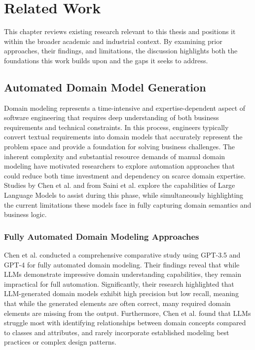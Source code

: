 \chapter{Related Work}\label{chapter:relatedwork}
This chapter reviews existing research relevant to this thesis and positions it within the broader academic and industrial context. By examining prior approaches, their findings, and limitations, the discussion highlights both the foundations this work builds upon and the gaps it seeks to address.

\section{Automated Domain Model Generation}\label{admg}
Domain modeling represents a time-intensive and expertise-dependent aspect of software engineering that requires deep understanding of both business requirements and technical constraints. In this process, engineers typically convert textual requirements into domain models that accurately represent the problem space and provide a foundation for solving business challenges. The inherent complexity and substantial resource demands of manual domain modeling have motivated researchers to explore automation approaches that could reduce both time investment and dependency on scarce domain expertise. Studies by Chen et al. \autocite{chen2023automated} and from Saini et al. \autocite{Saini2022} explore the capabilities of Large Language Models to assist during this phase, while simultaneously highlighting the current limitations these models face in fully capturing domain semantics and business logic. 

\subsection{Fully Automated Domain Modeling Approaches}

Chen et al. \autocite{chen2023automated} conducted a comprehensive comparative study using GPT-3.5 and GPT-4 for fully automated domain modeling. Their findings reveal that while LLMs demonstrate impressive domain understanding capabilities, they remain impractical for full automation. Significantly, their research highlighted that LLM-generated domain models exhibit high precision but low recall, meaning that while the generated elements are often correct, many required domain elements are missing from the output. Furthermore, Chen et al. found that LLMs struggle most with identifying relationships between domain concepts compared to classes and attributes, and rarely incorporate established modeling best practices or complex design patterns.

